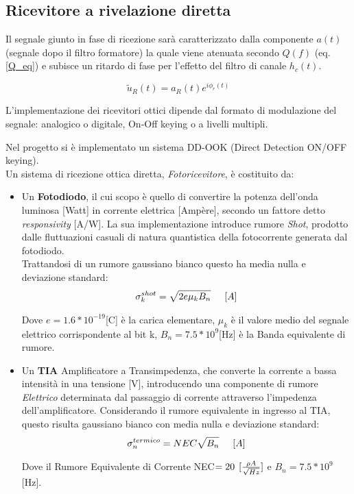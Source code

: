 \documentclass[12pt, a4paper]{article}
\begin{document}

\subsection{Ricevitore a rivelazione diretta}
\label{sub:rice}


Il segnale giunto in fase di ricezione sarà caratterizzato dalla componente $a(t)$ (segnale dopo il filtro formatore)  la quale viene atenuata secondo $Q(f)$ (eq. \ref{Q_eq}) e subisce un ritardo di fase per l'effetto del filtro di canale $h_c(t)$.

\begin{equation}
	\tilde{u}_R(t) = a_R(t)e^{i\phi_r(t)}
\end{equation}

L'implementazione dei ricevitori ottici dipende dal formato di modulazione del segnale: analogico o digitale, On-Off keying o a livelli multipli.

Nel progetto si è implementato un sistema DD-OOK (Direct Detection ON/OFF keying).\\
Un sistema di ricezione ottica diretta, \textit{Fotoricevitore}, è costituito da:
\begin{itemize}
	\item Un \textbf{Fotodiodo}, il cui scopo è quello di convertire la potenza dell'onda luminosa [Watt] in corrente elettrica [Ampère], secondo un fattore detto \textit{responsivity} [A/W].
	La sua implementazione introduce rumore \textit{Shot}, prodotto dalle fluttuazioni casuali di natura quantistica della fotocorrente generata dal fotodiodo.\\
	Trattandosi di un rumore gaussiano bianco questo ha media nulla e deviazione standard:\\
	\begin{align*}
	\sigma_k^{shot} = \sqrt{2e\mu_kB_n}  \hspace{5mm}[A]
\end{align*}

	Dove $e = 1.6*10^{-19} $[C] è la carica elementare, $\mu_k$ è il valore medio del segnale elettrico corrispondente al bit k, $B_n =7.5 *10^9$[Hz] è la Banda equivalente di rumore.
	
	\item Un \textbf{TIA} Amplificatore a Transimpedenza, che converte la corrente a bassa intensità in una tensione [V], introducendo una componente di rumore \textit{Elettrico} determinata dal passaggio di corrente attraverso l'impedenza dell'amplificatore.
	Considerando il rumore equivalente in ingresso al TIA, questo risulta gaussiano bianco con media nulla e deviazione standard:
	\begin{align*}
	\sigma_n^{termico} = NEC\sqrt{B_n} \hspace{5mm} [A]
\end{align*}

	Dove il Rumore Equivalente di Corrente NEC$=20 \hspace{1.5mm}[\frac{\rho A}{\sqrt{Hz}}]$  e $B_n = 7.5 *10^9$[Hz].
	
\end{itemize}
\end{document}
